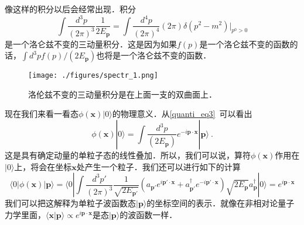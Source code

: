 像这样的积分以后会经常出现．积分
\begin{equation}
\int \frac{d^3p}{(2\pi)^3} \frac{1}{2 E_{\mathbf p}} = \int \frac{d^4 p}{(2\pi)^4} (2\pi) \delta(p^2 - m^2) \bigg|_{p^0>0}
\end{equation}
是一个洛仑兹不变的三动量积分．这是因为如果$f(p)$是一个洛仑兹不变的函数的话，$\int d^3 p f(p)/(2E_{\mathbf p})$也将是一个洛仑兹不变的函数．
\begin{figure}[ht]
\centering
\texttt{[image: ./figures/spectr\_1.png]}
\caption{洛伦兹不变的三动量积分是在上面一支的双曲面上．} \label{spectr_fig1}
\end{figure}
现在我们来看一看态$\phi(\mathbf x)|0\rangle$的物理意义．从\autoref{quanti_eq3}~可以看出
\begin{equation}
\phi(\mathbf x) | 0 \rangle = \int \frac{d^3p}{(2E_{\mathbf p})} e^{-i \mathbf p \cdot \mathbf x} | \mathbf p \rangle~.
\end{equation}
这是具有确定动量的单粒子态的线性叠加．所以，我们可以说，算符$\phi(\mathbf x)$作用在$|0 \rangle$上，将会在坐标$\mathbf x$处产生一个粒子．我们还可以进行如下的计算
\begin{equation}
\langle 0 | \phi(\mathbf x) | \mathbf p \rangle = \langle 0 | \int \frac{d^3 p'}{(2\pi)^3} \frac{1}{\sqrt{2E_{\mathbf p'}}}(a_{\mathbf p'}e^{i \mathbf p'\cdot \mathbf x} + a^\dagger_{\mathbf p'} e^{-i \mathbf p' \cdot \mathbf x} ) \sqrt{2E_{\mathbf p}} a^\dagger_{\mathbf p} | 0 \rangle  = e^{i \mathbf p \cdot \mathbf x} 
\end{equation}
我们可以把这解释为单粒子波函数态$|\mathbf p \rangle$的坐标空间的表示．就像在非相对论量子力学里面，$\langle \mathbf x| \mathbf p \rangle \propto e^{i\mathbf p \cdot \mathbf x}$是态$|\mathbf p\rangle$的波函数一样．











